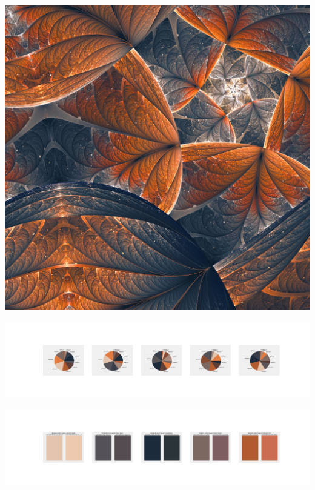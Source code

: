 \documentclass[11pt]{article}
\begin{document}
\begin{landscape}
    \begin{center}
    \includegraphics[width=\textwidth]{./nbimg/file (446).jpg}
    \end{center}

    \begin{center}
    \includegraphics[width=250mm]{./nbimg/pie-385.jpg}
    \end{center}

    \begin{center}
    \includegraphics[width=250mm]{./nbimg/peak-385.jpg}
    \end{center}
    


\end{landscape}
\end{document}
